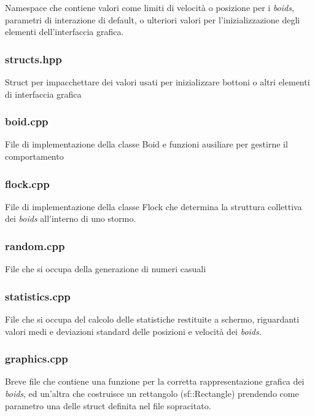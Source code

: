 \documentclass[10pt,a4paper]{article}
\begin{document}
Namespace che contiene valori come limiti di velocità o posizione per i \textit{boids}, parametri di interazione di default, o ulteriori valori per l'inizializzazione degli elementi dell'interfaccia grafica.

\subsubsection{structs.hpp}

Struct per impacchettare dei valori usati per inizializzare bottoni o altri elementi di interfaccia grafica

\subsubsection{boid.cpp}

File di implementazione della classe Boid e funzioni ausiliare per gestirne il comportamento

\subsubsection{flock.cpp}

File di implementazione della classe Flock che determina la struttura collettiva dei \textit{boids} all'interno di uno stormo.

\subsubsection{random.cpp}

File che si occupa della generazione di numeri casuali

\subsubsection{statistics.cpp}

File che si occupa del calcolo delle statistiche restituite a schermo, riguardanti valori medi e deviazioni standard delle posizioni e velocità dei \textit{boids}.

\subsubsection{graphics.cpp}

Breve file che contiene una funzione per la corretta rappresentazione grafica dei \textit{boids}, ed un'altra che costruisce un rettangolo (sf::Rectangle) prendendo come parametro una delle struct definita nel file sopracitato.
\end{document}
